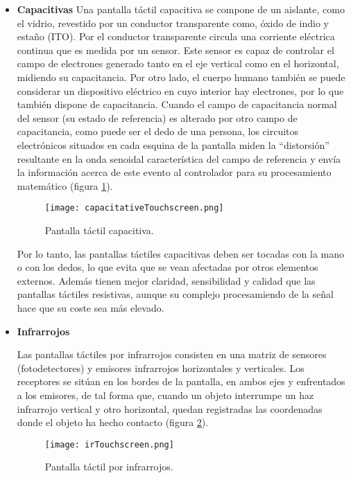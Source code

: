 \begin{itemize}
\item \textbf{Capacitivas}
Una pantalla táctil capacitiva se compone de un aislante, como el vidrio, 
revestido por un conductor transparente como, óxido de indio y estaño (ITO).
Por el conductor transparente circula una corriente eléctrica continua
que es medida por un sensor. Este sensor es capaz de controlar el campo de
electrones generado tanto en el eje vertical como en el horizontal, midiendo
su capacitancia. Por otro lado, el cuerpo humano también se puede considerar un 
dispositivo eléctrico en cuyo interior hay electrones, por lo que también 
dispone de capacitancia. Cuando el campo de capacitancia normal del sensor (su 
estado de referencia) es alterado por otro campo de capacitancia, como puede 
ser el dedo de una persona, los circuitos electrónicos situados en cada esquina 
de la pantalla miden la ``distorsión'' resultante en la onda senoidal 
característica del campo de referencia y envía la información acerca de este 
evento al controlador para su procesamiento matemático (figura
\ref{fig:capacitativeTouchscreen}).

  \begin{figure}[h]
    \begin{center}
      \texttt{[image: capacitativeTouchscreen.png]}
      \caption{Pantalla táctil capacitiva.}
      \label{fig:capacitativeTouchscreen}
    \end{center}
  \end{figure}

Por lo tanto, las pantallas táctiles capacitivas deben ser tocadas con la
mano o con los dedos, lo que evita que se vean afectadas por otros elementos
externos. Además tienen mejor claridad, sensibilidad y calidad que las
pantallas táctiles resistivas, aunque su complejo procesamiendo de la señal
hace que su coste sea más elevado.

\item \textbf{Infrarrojos}

Las pantallas táctiles por infrarrojos consisten en una matriz de sensores
(fotodetectores) y emisores infrarrojos horizontales y verticales. Los 
receptores se sitúan en los bordes de la pantalla, en ambos ejes y enfrentados
a los emisores, de tal forma que, cuando un objeto interrumpe un haz
infrarrojo vertical y otro horizontal, quedan registradas las coordenadas
donde el objeto ha hecho contacto (figura \ref{fig:irTouchscreen}).

  \begin{figure}[h]
    \begin{center}
      \texttt{[image: irTouchscreen.png]}
      \caption{Pantalla táctil por infrarrojos.}
      \label{fig:irTouchscreen}
    \end{center}
  \end{figure}


\end{itemize}
